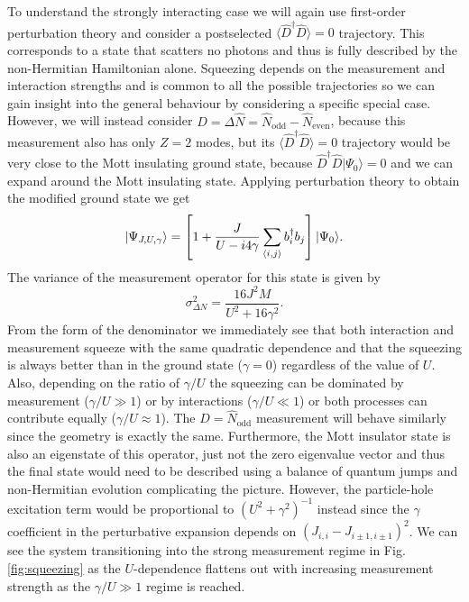To understand the strongly interacting case we will again use
first-order perturbation theory and consider a postselected
$\langle \hat{D}^\dagger \hat{D} \rangle = 0$ trajectory. This
corresponds to a state that scatters no photons and thus is fully
described by the non-Hermitian Hamiltonian alone. Squeezing depends on
the measurement and interaction strengths and is common to all the
possible trajectories so we can gain insight into the general
behaviour by considering a specific special case. However, we will
instead consider
$\hat{D} = \Delta \hat{N} = \hat{N}_\mathrm{odd} -
\hat{N}_\mathrm{even}$, because this measurement also has only $Z = 2$
modes, but its $\langle \hat{D}^\dagger \hat{D} \rangle = 0$
trajectory would be very close to the Mott insulating ground state,
because $\hat{D}^\dagger \hat{D} | \Psi_0 \rangle = 0$ and we can
expand around the Mott insulating state. Applying perturbation theory
to obtain the modified ground state we get
\begin{equation}
  | \Psi_{J,U, \gamma} \rangle = \left[ 1 + \frac{J}{U - i 4 \gamma} \sum_{\langle i, j
      \rangle} b^\dagger_i b_j \right] | \Psi_0 \rangle.
\end{equation}
The variance of the measurement operator for this state is given by
\begin{equation}
  \sigma^2_{\Delta N} = \frac{16 J^2 M} {U^2 + 16 \gamma^2}.
\end{equation}
From the form of the denominator we immediately see that both
interaction and measurement squeeze with the same quadratic dependence
and that the squeezing is always better than in the ground state
($\gamma = 0$) regardless of the value of $U$. Also, depending on the
ratio of $\gamma/U$ the squeezing can be dominated by measurement
($\gamma/U \gg 1$) or by interactions ($\gamma/U \ll 1$) or both
processes can contribute equally ($\gamma/U \approx 1$). The
$\hat{D} = \hat{N}_\mathrm{odd}$ measurement will behave similarly
since the geometry is exactly the same. Furthermore, the Mott
insulator state is also an eigenstate of this operator, just not the
zero eigenvalue vector and thus the final state would need to be
described using a balance of quantum jumps and non-Hermitian evolution
complicating the picture. However, the particle-hole excitation term
would be proportional to $(U^2 + \gamma^2)^{-1}$ instead since the
$\gamma$ coefficient in the perturbative expansion depends on
$(J_{i,i} - J_{i\pm1,i\pm1})^2$. We can see the system transitioning
into the strong measurement regime in Fig. \ref{fig:squeezing} as the
$U$-dependence flattens out with increasing measurement strength as
the $\gamma/U \gg 1$ regime is reached.

